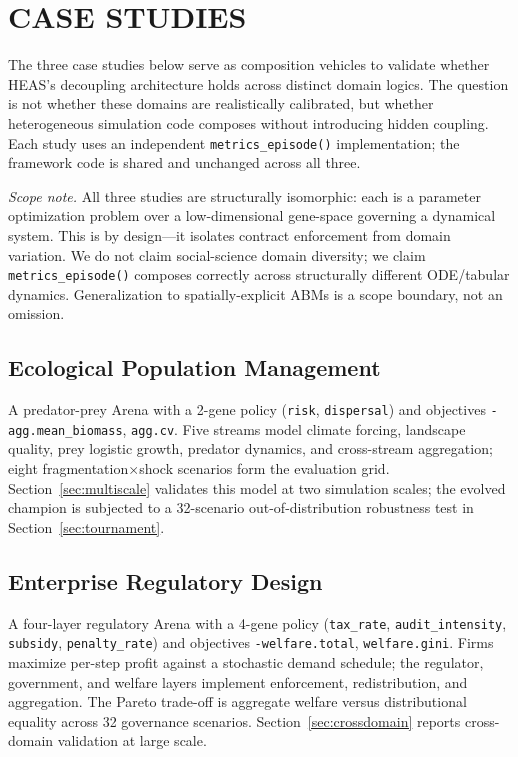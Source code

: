 \documentclass{wscpaperproc}
\begin{document}
\section{CASE STUDIES}

The three case studies below serve as composition vehicles to validate whether HEAS's decoupling architecture holds across distinct domain logics. The question is not whether these domains are realistically calibrated, but whether heterogeneous simulation code composes without introducing hidden coupling. Each study uses an independent \texttt{metrics\_episode()} implementation; the framework code is shared and unchanged across all three.

\textit{Scope note.} All three studies are structurally isomorphic: each is a
parameter optimization problem over a low-dimensional gene-space governing a
dynamical system. This is by design---it isolates contract enforcement from
domain variation. We do not claim social-science domain diversity; we claim
\texttt{metrics\_episode()} composes correctly across structurally different
ODE/tabular dynamics. Generalization to spatially-explicit ABMs is a scope
boundary, not an omission.

\subsection{Ecological Population Management}

A predator-prey Arena with a 2-gene policy (\texttt{risk},
\texttt{dispersal}) and objectives \texttt{-agg.mean\_biomass},
\texttt{agg.cv}. Five streams model climate forcing, landscape quality, prey
logistic growth, predator dynamics, and cross-stream aggregation; eight
fragmentation$\times$shock scenarios form the evaluation grid.
Section~\ref{sec:multiscale} validates this model at two simulation scales; the evolved champion
is subjected to a 32-scenario out-of-distribution robustness test in
Section~\ref{sec:tournament}.

\subsection{Enterprise Regulatory Design}

A four-layer regulatory Arena with a 4-gene policy
(\texttt{tax\_rate}, \texttt{audit\_intensity}, \texttt{subsidy},
\texttt{penalty\_rate}) and objectives \texttt{-welfare.total},
\texttt{welfare.gini}. Firms maximize per-step profit against a stochastic
demand schedule; the regulator, government, and welfare layers implement
enforcement, redistribution, and aggregation. The Pareto trade-off is
aggregate welfare versus distributional equality across 32 governance scenarios.
Section~\ref{sec:crossdomain} reports cross-domain validation at large scale.
\end{document}
